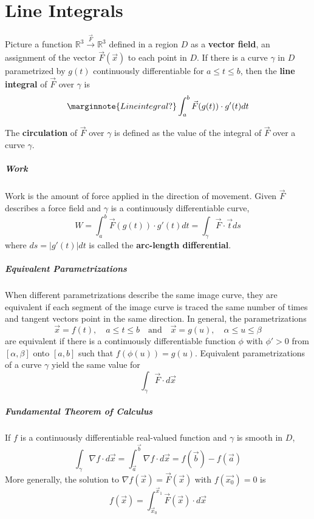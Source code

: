 \documentclass[11pt]{article}
\begin{document}
\section{Line Integrals}
	Picture a function $\mathbb{R}^3 \xrightarrow{\vec{F}} \mathbb{R}^3$ defined in a region $D$ as a \textbf{vector field}, an assignment of the vector $\vec{F}(\vec{x})$ to each point in $D$. If there is a curve $\gamma$ in $D$ parametrized by $g(t)$ continuously differentiable for $a \leq t \leq b$, then the \textbf{line integral} of $\vec{F}$ over $\gamma$ is
	\begin{equation}\marginnote{Line integral?}
		\int_a^b \vec{F}(g(t)) \cdot g'(t)dt
	\end{equation}
	
	The \textbf{circulation} of $\vec{F}$ over $\gamma$ is defined as the value of the integral of $\vec{F}$ over a curve $\gamma$. 
	
	\subparagraph{Work} Work is the amount of force applied in the direction of movement. Given $\vec{F}$ describes a force field and $\gamma$ is a continuously differentiable curve, 
	\begin{equation}
		W = \int_a^b \vec{F}(g(t)) \cdot g'(t)dt = \int_\gamma \vec{F} \cdot \vec{t} ds
	\end{equation}
	where $ds = |g'(t)|dt$ is called the \textbf{arc-length differential}.
	
	\subparagraph{Equivalent Parametrizations} When different parametrizations describe the same image curve, they are equivalent if each segment of the image curve is traced the same number of times and tangent vectors point in the same direction. In general, the parametrizations
	\begin{equation}
		\vec{x} = f(t), \quad a \leq t \leq b \quad \text{and} \quad \vec{x} = g(u), \quad \alpha \leq u \leq \beta
	\end{equation}
	are equivalent if there is a continuously differentiable function $\phi$ with $\phi ' > 0$ from $[\alpha, \beta]$ onto $[a, b]$ such that $f(\phi(u)) = g(u)$. Equivalent parametrizations of a curve $\gamma$ yield the same value for 
	\begin{equation*}
		\int_\gamma \vec{F} \cdot d\vec{x}
	\end{equation*}
	

	\subparagraph{Fundamental Theorem of Calculus} If $f$ is a continuously differentiable real-valued function and $\gamma$ is smooth in $D$,
		\begin{equation}
			\int_\gamma \nabla f \cdot d\vec{x} = \int_{\vec{a}}^{\vec{b}} \nabla f \cdot d\vec{x} = f(\vec{b}) - f(\vec{a})
		\end{equation}
		More generally, the solution to $\nabla f(\vec{x}) = \vec{F}(\vec{x})$ with $f(\vec{x_0}) = 0$ is
		\begin{equation}
			f(\vec{x}) = \int_{\vec{x}_0}^{\vec{x}_1} \vec{F}(\vec{x}) \cdot d\vec{x}
		\end{equation}
		
\end{document}
